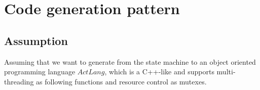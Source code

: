 \section{Code generation pattern}
\label{sec:codegen}


\subsection{Assumption}
Assuming that we want to generate from the state machine to an object oriented programming language $ActLang$, which is a C++-like and supports multi-threading as following functions and resource control as mutexes.
